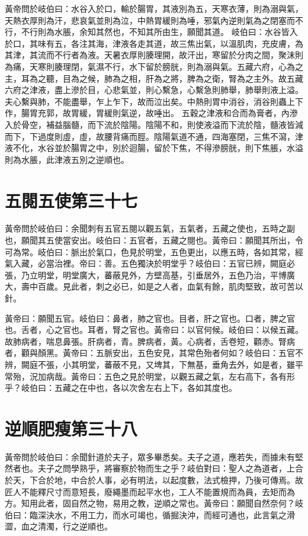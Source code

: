 黃帝問於岐伯曰：水谷入於口，輸於腸胃，其液別為五，天寒衣薄，則為溺與氣，天熱衣厚則為汗，悲哀氣並則為泣，中熱胃緩則為唾，邪氣內逆則氣為之閉塞而不行，不行則為水脹，余知其然也，不知其所由生，願聞其道。
岐伯曰：水谷皆入於口，其味有五，各注其海，津液各走其道，故三焦出氣，以溫肌肉，充皮膚，為其津，其流而不行者為液。天暑衣厚則腠理開，故汗出，寒留於分肉之間，聚沫則為痛，天寒則腠理閉，氣濕不行，水下留於膀胱，則為溺與氣。五藏六府，心為之主，耳為之聽，目為之候，肺為之相，肝為之將，脾為之衛，腎為之主外。故五藏六府之津液，盡上滲於目，心悲氣並，則心繫急，心繫急則肺舉，肺舉則液上溢。夫心繫與肺，不能盡舉，乍上乍下，故而泣出矣。中熱則胃中消谷，消谷則蟲上下作，腸胃充郭，故胃緩，胃緩則氣逆，故唾出。
五穀之津液和合而為膏者，內滲入於骨空，補益腦髓，而下流於陰陽。陰陽不和，則使液溢而下流於陰，髓液皆減而下，下過度則虛，虛，故腰背痛而脛。陰陽氣道不通，四海塞閉，三焦不瀉，津液不化，水谷並於腸胃之中，別於迴腸，留於下焦，不得滲膀胱，則下焦脹，水溢則為水脹，此津液五別之逆順也。

\section{五閱五使第三十七}

黃帝問於岐伯曰：余聞刺有五官五閱以觀五氣，五氣者，五藏之使也，五時之副也，願聞其五使當安出。岐伯曰：五官者，五藏之閱也。黃帝曰：願聞其所出，令可為常。岐伯曰：脈出於氣口，色見於明堂，五色更出，以應五時，各如其常，經氣入藏，必當治裡。帝曰：善。五色獨決於明堂乎？岐伯曰：五官已辨，闕庭必張，乃立明堂，明堂廣大，蕃蔽見外，方壁高基，引垂居外，五色乃治，平博廣大，壽中百歲。見此者，刺之必已，如是之人者，血氣有餘，肌肉堅致，故可苦以針。

黃帝曰：願聞五官。岐伯曰：鼻者，肺之官也。目者，肝之官也。口者，脾之官也。舌者，心之官也。耳者，腎之官也。黃帝曰：以官何候。岐伯曰：以候五藏。故肺病者，喘息鼻張。肝病者，青。脾病者，黃。心病者，舌卷短，顴赤。腎病者，顴與顏黑。黃帝曰：五脈安出，五色安見，其常色殆者何如？岐伯曰：五官不辨，闕庭不張，小其明堂，蕃蔽不見，又埤其，下無基，垂角去外，如是者，雖平常殆，況加病哉。黃帝曰：五色之見於明堂，以觀五藏之氣，左右高下，各有形乎？岐伯曰：五藏之在中也，各以次舍左右上下，各如其度也。

\section{逆順肥瘦第三十八}

黃帝問於岐伯曰：余聞針道於夫子，眾多畢悉矣。夫子之道，應若失，而據未有堅然者也。夫子之問學熟乎，將審察於物而生之乎？岐伯對曰：聖人之為道者，上合於天，下合於地，中合於人事，必有明法，以起度數，法式檢押，乃後可傳焉。故匠人不能釋尺寸而意短長，廢繩墨而起平水也，工人不能置規而為員，去矩而為方。知用此者，固自然之物，易用之教，逆順之常也。黃帝曰：願聞自然奈何？岐伯曰：臨深決水，不用工力，而水可竭也，循掘決沖，而經可通也，此言氣之滑澀，血之清濁，行之逆順也。

